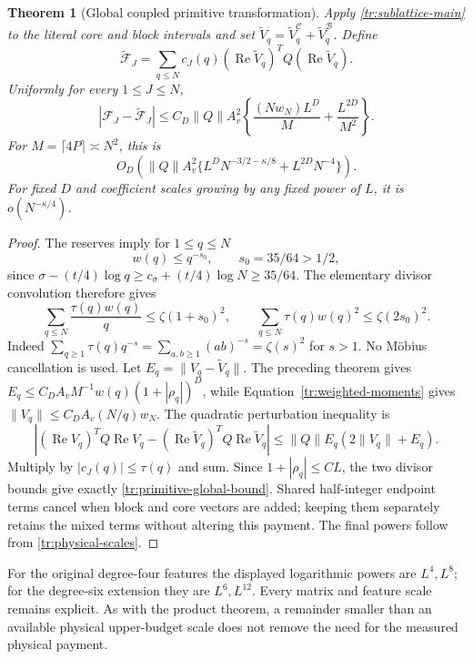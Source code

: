 \documentclass[11pt]{article}
\numberwithin{equation}{section}
\newtheorem{theorem}{Theorem}[section]
\theoremstyle{definition}
\theoremstyle{remark}
\begin{document}
\begin{theorem}[Global coupled primitive transformation]
\label{tr:global-primitive}
Apply \eqref{tr:sublattice-main} to the literal core and block
intervals and set
$\widetilde V_q=\widetilde V_q^{\mathcal C}+\widetilde V_q^{\mathcal B}$.
Define
\[
 \widetilde{\mathcal F}_J=\sum_{q\le N}c_J(q)
 (\operatorname{Re}\widetilde V_q)^TQ
 (\operatorname{Re}\widetilde V_q).
\]
Uniformly for every $1\le J\le N$,
\begin{equation}
\label{tr:primitive-global-bound}
 |\mathcal F_J-\widetilde{\mathcal F}_J|
 \le C_D\|Q\|A_v^2
 \left\{\frac{(Nw_N)L^D}{M}+\frac{L^{2D}}{M^2}\right\}.
\end{equation}
For $M=\lceil4P\rceil\asymp N^2$, this is
\[
 O_D\!\left(\|Q\|A_v^2
       \{L^DN^{-3/2-\kappa/8}+L^{2D}N^{-4}\}\right).
\]
For fixed $D$ and coefficient scales growing by any fixed power of $L$,
it is $o(N^{-\kappa/4})$.
\end{theorem}
\begin{proof}
The reserves imply for $1\le q\le N$
\[
 w(q)\le q^{-s_0},\qquad s_0=35/64>1/2,
\]
since $\sigma-(t/4)\log q\ge c_\sigma+(t/4)\log N\ge35/64$.
The elementary divisor convolution therefore gives
\[
 \sum_{q\le N}\frac{\tau(q)w(q)}q\le\zeta(1+s_0)^2,
 \qquad
 \sum_{q\le N}\tau(q)w(q)^2\le\zeta(2s_0)^2.
\]
Indeed $\sum_{q\ge1}\tau(q)q^{-s}=\sum_{a,b\ge1}(ab)^{-s}
=\zeta(s)^2$ for $s>1$.  No M\"obius cancellation is used.
Let $E_q=\|V_q-\widetilde V_q\|$.  The preceding theorem gives
$E_q\le C_DA_vM^{-1}w(q)(1+|\rho_q|)^D$, while
Equation~\eqref{tr:weighted-moments} gives
$\|V_q\|\le C_DA_v(N/q)w_N$.  The quadratic perturbation inequality is
\[
 \left|(\operatorname{Re}V_q)^TQ\operatorname{Re}V_q
 -(\operatorname{Re}\widetilde V_q)^TQ\operatorname{Re}\widetilde V_q
 \right|\le\|Q\|E_q(2\|V_q\|+E_q).
\]
Multiply by $|c_J(q)|\le\tau(q)$ and sum.  Since
$1+|\rho_q|\le CL$, the two divisor bounds give exactly
\eqref{tr:primitive-global-bound}.  Shared half-integer endpoint terms
cancel when block and core vectors are added; keeping them separately
retains the mixed terms without altering this payment.  The final powers
follow from \eqref{tr:physical-scales}.
\end{proof}

For the original degree-four features the displayed logarithmic powers
are $L^4,L^8$; for the degree-six extension they are $L^6,L^{12}$.
Every matrix and feature scale remains explicit.  As with the product
theorem, a remainder smaller than an available physical upper-budget
scale does not remove the need for the measured physical payment.
\end{document}
